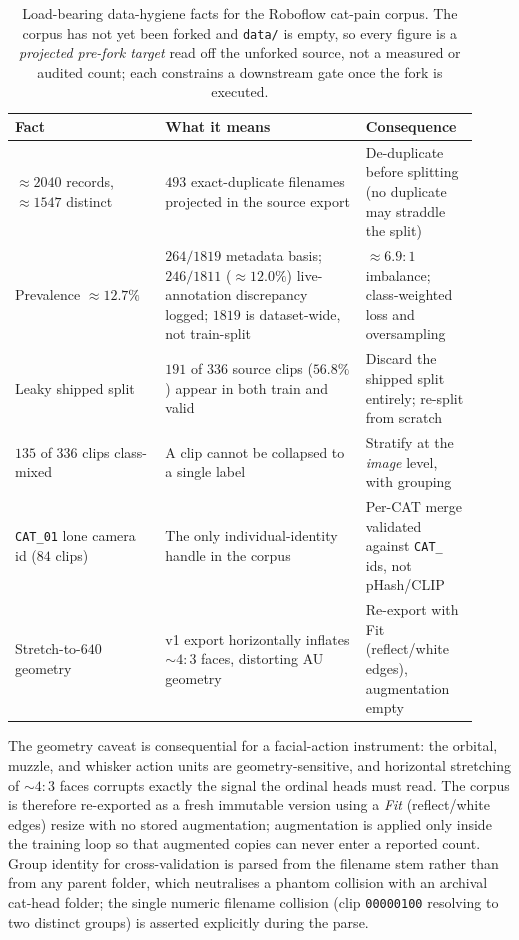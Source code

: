 \begin{table}[t]
\centering
\caption[Load-bearing data-hygiene facts]{Load-bearing data-hygiene facts for
the Roboflow cat-pain corpus. The corpus has not yet been forked and
\texttt{data/} is empty, so every figure is a \emph{projected pre-fork target}
read off the unforked source, not a measured or audited count; each constrains a
downstream gate once the fork is executed.}
\label{tab:hygiene}
\small
\begin{tabular}{@{}p{0.30\linewidth}p{0.40\linewidth}p{0.22\linewidth}@{}}
\toprule
\textbf{Fact} & \textbf{What it means} & \textbf{Consequence} \\
\midrule
$\approx 2040$ records, $\approx 1547$ distinct &
$493$ exact-duplicate filenames projected in the source export &
De-duplicate before splitting (no duplicate may straddle the split) \\
\addlinespace
Prevalence $\approx 12.7\%$ &
$264/1819$ metadata basis; $246/1811$ ($\approx 12.0\%$) live-annotation
discrepancy logged; $1819$ is dataset-wide, not train-split &
$\approx 6.9{:}1$ imbalance; class-weighted loss and oversampling \\
\addlinespace
Leaky shipped split &
$191$ of $336$ source clips ($56.8\%$) appear in both train and valid &
Discard the shipped split entirely; re-split from scratch \\
\addlinespace
$135$ of $336$ clips class-mixed &
A clip cannot be collapsed to a single label &
Stratify at the \emph{image} level, with grouping \\
\addlinespace
\texttt{CAT\_01} lone camera id ($84$ clips) &
The only individual-identity handle in the corpus &
Per-CAT merge validated against \texttt{CAT\_} ids, not pHash/CLIP \\
\addlinespace
Stretch-to-$640$ geometry &
v1 export horizontally inflates $\sim 4{:}3$ faces, distorting AU geometry &
Re-export with Fit (reflect/white edges), augmentation empty \\
\bottomrule
\end{tabular}
\end{table}

The geometry caveat is consequential for a facial-action instrument: the
orbital, muzzle, and whisker action units are geometry-sensitive, and horizontal
stretching of $\sim\!4{:}3$ faces corrupts exactly the signal the ordinal heads
must read. The corpus is therefore re-exported as a fresh immutable version
using a \emph{Fit} (reflect/white edges) resize with no stored augmentation;
augmentation is applied only inside the training loop so that augmented copies
can never enter a reported count. Group identity for cross-validation is parsed
from the filename stem rather than from any parent folder, which neutralises a
phantom collision with an archival cat-head folder; the single numeric
filename collision (clip \texttt{00000100} resolving to two distinct groups) is
asserted explicitly during the parse.

